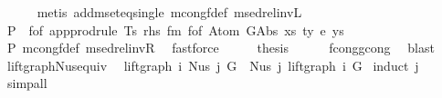 \begin{isabellebody}
\ \ \ \ \isamarkupfalse%
\ {\isacharparenleft}{\kern0pt}metis\ add{\isacharunderscore}{\kern0pt}mset{\isacharunderscore}{\kern0pt}eq{\isacharunderscore}{\kern0pt}single\ mcong{\isacharunderscore}{\kern0pt}f{\isacharunderscore}{\kern0pt}def\ msed{\isacharunderscore}{\kern0pt}rel{\isacharunderscore}{\kern0pt}invL{\isacharparenright}{\kern0pt}\isanewline
\ \ \isamarkupfalse%
\ \isamarkupfalse%
\ P{}{\isacharcolon}{\kern0pt}\ {\isachardoublequoteopen}{\isasymnot}\ f{\isacharunderscore}{\kern0pt}of\ {\isacharparenleft}{\kern0pt}app{\isacharunderscore}{\kern0pt}prodrule\ Ts\ rhs{\isacharparenright}{\kern0pt}\ {\isasymsimeq}fm\ f{\isacharunderscore}{\kern0pt}of\ {\isacharparenleft}{\kern0pt}Atom\ {\isacharparenleft}{\kern0pt}GAbs\ xs\ ty{}\ e{\isacharparenright}{\kern0pt}\ ys{\isacharparenright}{\kern0pt}{\isachardoublequoteclose}\isanewline
\ \ \ \ \isamarkupfalse%
\ P{}\ mcong{\isacharunderscore}{\kern0pt}f{\isacharunderscore}{\kern0pt}def\ msed{\isacharunderscore}{\kern0pt}rel{\isacharunderscore}{\kern0pt}invR\ \isamarkupfalse%
\ fastforce\isanewline
\ \ \isamarkupfalse%
\ \isamarkupfalse%
\ {\isacharquery}{\kern0pt}thesis\isanewline
\ \ \ \ \isamarkupfalse%
\ f{\isacharunderscore}{\kern0pt}cong{\isacharunderscore}{\kern0pt}gcong\ \isamarkupfalse%
\ blast\isanewline
{}\isamarkupfalse%
%
\endisatagproof
{\isafoldproof}%
%
\isadelimproof
%
\endisadelimproof
%
\isadelimdocument
%
\endisadelimdocument
%
\isatagdocument
%
\isamarkuptrue%
%
\endisatagdocument
{\isafolddocument}%
%
\isadelimdocument
%
\endisadelimdocument
{}\isamarkupfalse%
\ lift{\isacharunderscore}{\kern0pt}graph{\isacharunderscore}{\kern0pt}Nus{}{\isacharunderscore}{\kern0pt}equiv{\isacharcolon}{\kern0pt}\isanewline
\ \ {\isachardoublequoteopen}lift{\isacharunderscore}{\kern0pt}graph\ i\ {\isacharparenleft}{\kern0pt}Nus{}\ j\ G{\isacharparenright}{\kern0pt}\ {\isacharequal}{\kern0pt}\ Nus{}\ j\ {\isacharparenleft}{\kern0pt}lift{\isacharunderscore}{\kern0pt}graph\ i\ G{\isacharparenright}{\kern0pt}{\isachardoublequoteclose}\isanewline
%
\isadelimproof
%
\endisadelimproof
%
\isatagproof
{}\isamarkupfalse%
\ {\isacharparenleft}{\kern0pt}induct\ j{\isacharparenright}{\kern0pt}\isanewline
{}\isamarkupfalse%
\ simp{\isacharunderscore}{\kern0pt}all%

\end{isabellebody}
